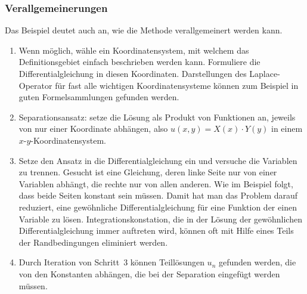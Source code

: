 \subsubsection{Verallgemeinerungen}
Das Beispiel deutet auch an, wie die Methode verallgemeinert werden kann.
\begin{enumerate}
\item
Wenn möglich, wähle ein Koordinatensystem, mit welchem das Definitionsgebiet
einfach beschrieben werden kann.
Formuliere die Differentialgleichung in diesen Koordinaten.
Darstellungen des Laplace-Operator für fast alle wichtigen Koordinatensysteme
können zum Beispiel in guten Formelsammlungen gefunden werden.
\item
Separationsansatz: setze die Lösung als Produkt von Funktionen an,
jeweils von nur einer Koordinate abhängen, also
$u(x,y)=X(x)\cdot Y(y)$ in einem $x$-$y$-Koordinatensystem.
\item
Setze den Ansatz in die Differentialgleichung ein und versuche die
Variablen zu trennen. 
Gesucht ist eine Gleichung, deren linke Seite nur von einer Variablen
abhängt, die rechte nur von allen anderen.
Wie im Beispiel folgt, dass beide Seiten konstant sein müssen.
Damit hat man das Problem darauf reduziert, eine gewöhnliche
Differentialgleichung für eine Funktion der einen Variable zu lösen.
Integrationskonstation, die in der Lösung der gewöhnlichen
Differentialgleichung immer auftreten wird, können oft mit Hilfe
eines Teils der Randbedingungen eliminiert werden.
\item
Durch Iteration von Schritt~3 können Teillösungen $u_n$ gefunden werden,
die von den Konstanten abhängen, die bei der Separation eingefügt werden
müssen.
\end{enumerate}

